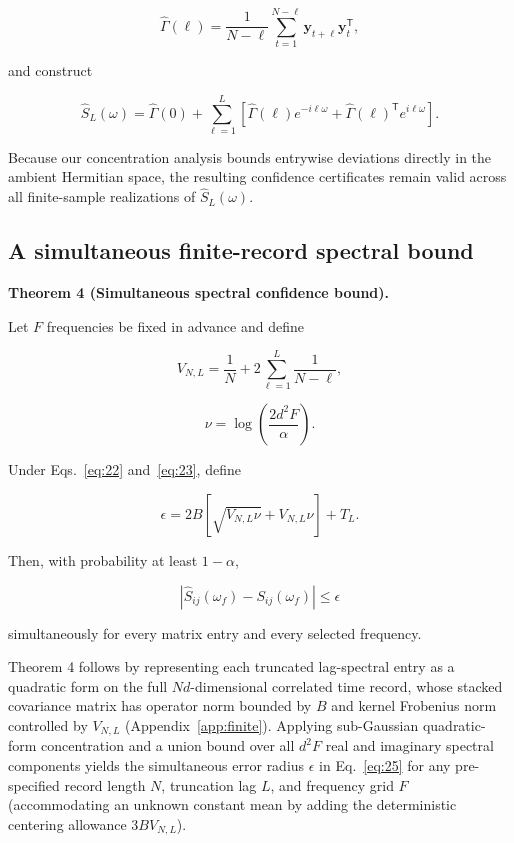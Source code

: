 \documentclass[aps,pre,reprint,amsmath,amssymb,superscriptaddress]{revtex4-2}
\begin{document}
\[
\widehat\Gamma(\ell)
=
\frac1{N-\ell}
\sum_{t=1}^{N-\ell}
\mathbf y_{t+\ell}\mathbf y_t^{\mathsf T},
\]

and construct

\begin{equation}\label{eq:24}
\boxed{
\widehat S_L(\omega)
=
\widehat\Gamma(0)
+
\sum_{\ell=1}^{L}
\left[
\widehat\Gamma(\ell)e^{-i\ell\omega}
+
\widehat\Gamma(\ell)^{\mathsf T}e^{i\ell\omega}
\right].
}
\end{equation}

Because our concentration analysis bounds entrywise deviations directly in the ambient Hermitian space, the resulting confidence certificates remain valid across all finite-sample realizations of $\hat{S}_L(\omega)$.

\subsection{A simultaneous finite-record spectral bound}

\textbf{Theorem 4 (Simultaneous spectral confidence bound).}

Let \(F\) frequencies be fixed in advance and define

\[
V_{N,L}
=
\frac1N+
2\sum_{\ell=1}^{L}\frac1{N-\ell},
\]

\[
\nu=
\log\left(\frac{2d^2F}{\alpha}\right).
\]

Under Eqs.~\eqref{eq:22} and~\eqref{eq:23}, define

\begin{equation}\label{eq:25}
\boxed{
\epsilon=
2B
\left[
\sqrt{V_{N,L}\nu}
+
V_{N,L}\nu
\right]
+
T_L.
}
\end{equation}

Then, with probability at least \(1-\alpha\),

\begin{equation}\label{eq:26}
\boxed{
|\widehat S_{ij}(\omega_f)-S_{ij}(\omega_f)|
\le\epsilon
}
\end{equation}

simultaneously for every matrix entry and every selected frequency.

Theorem 4 follows by representing each truncated lag-spectral entry as a quadratic form on the full $Nd$-dimensional correlated time record, whose stacked covariance matrix has operator norm bounded by $B$ and kernel Frobenius norm controlled by $V_{N,L}$ (Appendix~\ref{app:finite}). Applying sub-Gaussian quadratic-form concentration \cite{hsu2012} and a union bound over all $d^2 F$ real and imaginary spectral components yields the simultaneous error radius $\epsilon$ in Eq.~\eqref{eq:25} for any pre-specified record length $N$, truncation lag $L$, and frequency grid $F$ (accommodating an unknown constant mean by adding the deterministic centering allowance $3B V_{N,L}$).
\end{document}
